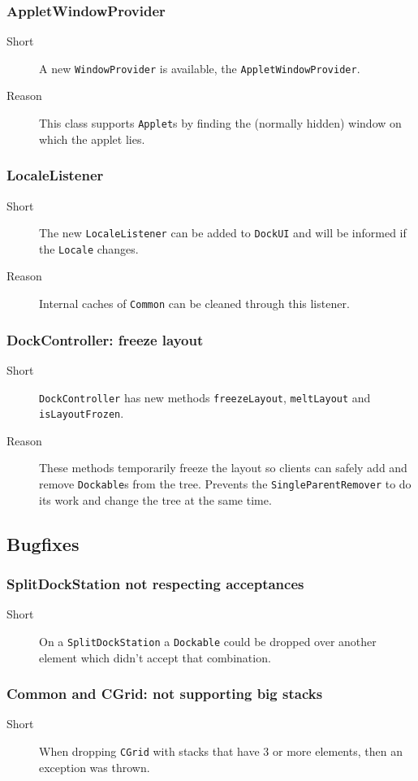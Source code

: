 \documentclass[a4paper,10pt]{article}
\newcommand{\src}[1]{\lstinline[basicstyle=\normalsize\ttfamily,keywordstyle=\normalsize\ttfamily,identifierstyle=\normalsize\ttfamily]|#1|}
\newcommand{\short}{\item[Short]}
\newcommand{\why}{\item[Reason]}
\begin{document}
\subsubsection{AppletWindowProvider}
\begin{description}
 \short A new \src{WindowProvider} is available, the \src{AppletWindowProvider}.
 \why This class supports \src{Applet}s by finding the (normally hidden) window on which the applet lies.
\end{description}

\subsubsection{LocaleListener}
\begin{description}
 \short The new \src{LocaleListener} can be added to \src{DockUI} and will be informed if the \src{Locale} changes.
 \why Internal caches of \src{Common} can be cleaned through this listener.
\end{description}

\subsubsection{DockController: freeze layout}
\begin{description}
 \short \src{DockController} has new methods \src{freezeLayout}, \src{meltLayout} and \linebreak \src{isLayoutFrozen}.
 \why These methods temporarily freeze the layout so clients can safely add and remove \src{Dockable}s from the tree. Prevents the \src{SingleParentRemover} to do its work and change the tree at the same time.
\end{description}

\subsection{Bugfixes}
\subsubsection{SplitDockStation not respecting acceptances}
\begin{description}
 \short On a \src{SplitDockStation} a \src{Dockable} could be dropped over another element which didn't accept that combination.
\end{description}

\subsubsection{Common and CGrid: not supporting big stacks}
\begin{description}
 \short When dropping \src{CGrid} with stacks that have 3 or more elements, then an exception was thrown.
\end{description}
\end{document}
